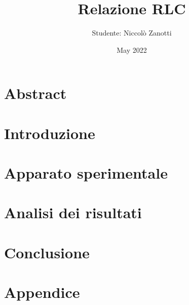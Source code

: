 \documentclass[12pt]{article}
\title{Relazione RLC}
\author{Studente: Niccolò Zanotti}
\date{May 2022}
\begin{document}
 \maketitle
 \hrulefill

 \section{Abstract}
    
 \section{Introduzione}
   
 \section{Apparato sperimentale}
 \section{Analisi dei risultati}
   
 \section{Conclusione}
  
 \section{Appendice}
   
 
\end{document}
